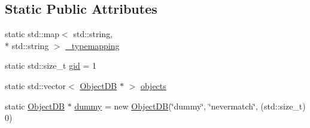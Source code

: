 \subsection*{Static Public Attributes}
\begin{DoxyCompactItemize}
\item 
static std\-::map$<$ std\-::string, \\*
std\-::string $>$ \hyperlink{structObjectDB_a5ac6046dd7ea5cf8c2adac6f6c5ed50e}{\-\_\-typemapping}
\item 
static std\-::size\-\_\-t \hyperlink{structObjectDB_a63154106183736bf0dac1188eff2d0aa}{gid} = 1
\item 
static std\-::vector$<$ \hyperlink{structObjectDB}{Object\-D\-B} $\ast$ $>$ \hyperlink{structObjectDB_abb9b942eb8b04ead17f60ce1b1b89ce7}{objects}
\item 
static \hyperlink{structObjectDB}{Object\-D\-B} $\ast$ \hyperlink{structObjectDB_a50ed67ad47552cecb2f94837740d70ff}{dummy} = new \hyperlink{structObjectDB}{Object\-D\-B}(\char`\"{}dummy\char`\"{}, \char`\"{}nevermatch\char`\"{}, (std\-::size\-\_\-t) 0)
\end{DoxyCompactItemize}


